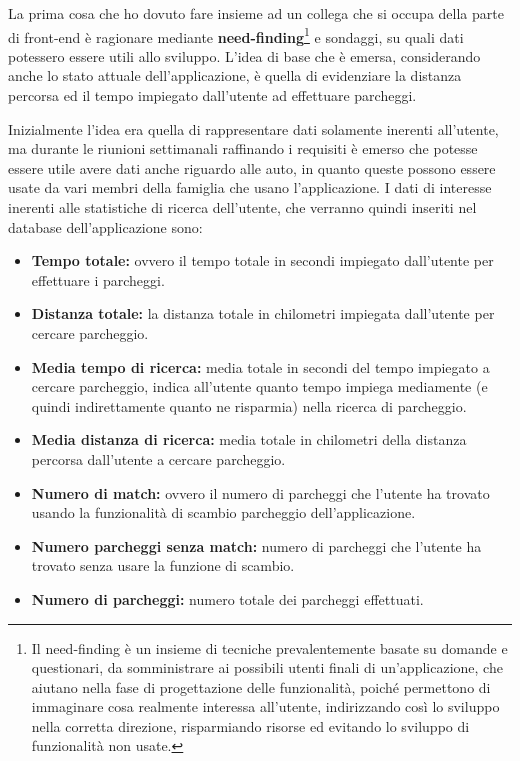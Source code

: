 \documentclass[italian, Lau, oneside, nodefaultfont, noexaminfo]{sapthesis}
\begin{document}
La prima cosa che ho dovuto fare insieme ad un collega che si occupa della parte di front-end  \`e ragionare  mediante \textbf{need-finding}\footnote{Il need-finding \`e un insieme di tecniche prevalentemente basate su domande e questionari, da somministrare ai possibili utenti finali di un'applicazione, che aiutano nella fase di progettazione delle funzionalità, poich\'e permettono di immaginare cosa realmente interessa all'utente, indirizzando cos\`i lo sviluppo nella corretta direzione, risparmiando risorse ed evitando lo sviluppo di funzionalit\`a non usate.}
e sondaggi, su quali dati potessero essere utili allo sviluppo. L'idea di base che \`e emersa, considerando anche lo stato attuale dell'applicazione, \`e quella di evidenziare la distanza percorsa ed il tempo impiegato dall'utente ad effettuare parcheggi. 

Inizialmente l'idea era quella di rappresentare dati solamente inerenti  all'utente, ma durante le riunioni settimanali  raffinando i requisiti \`e emerso che potesse essere utile avere dati anche riguardo alle auto, in quanto queste possono essere usate da vari membri della famiglia che usano l'applicazione.  
I dati di interesse inerenti alle statistiche di ricerca dell'utente, che verranno quindi inseriti nel database dell'applicazione sono:
\begin{itemize}
\item \textbf{Tempo totale:} ovvero il tempo totale in secondi impiegato dall'utente per effettuare i parcheggi.
\item \textbf{Distanza totale:} la distanza totale in chilometri impiegata dall'utente per cercare parcheggio.
\item \textbf{Media tempo di ricerca:} media totale in secondi del tempo impiegato a cercare parcheggio, indica all'utente quanto tempo impiega mediamente (e quindi indirettamente quanto ne risparmia) nella ricerca di parcheggio.
\item \textbf{Media distanza di ricerca:} media totale in chilometri della distanza percorsa dall'utente  a cercare parcheggio.
\item \textbf{Numero di match:} ovvero il numero di parcheggi che l'utente ha trovato usando la funzionalit\`a di scambio parcheggio dell'applicazione.
\item \textbf{Numero parcheggi senza match:} numero di parcheggi che l'utente ha trovato senza usare la funzione di scambio. 
\item \textbf{Numero di parcheggi:} numero totale dei parcheggi effettuati.  
\end{itemize}
\end{document}
